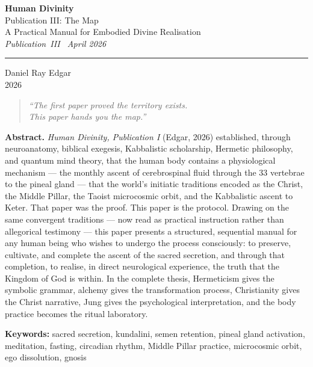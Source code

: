 \documentclass[12pt, a4paper]{article}
\begin{document}

\begin{titlepage}
  \centering
  \vspace*{2cm}

  {\LARGE\bfseries Human Divinity}\\[0.8em]
  {\large Publication III: The Map}\\[0.4em]
  {\large A Practical Manual for Embodied Divine Realisation}\\[0.4em]
  {\normalsize\itshape Publication~III \textbullet\ April 2026}

  \vspace{2cm}
  \rule{0.5\linewidth}{0.5pt}
  \vspace{2cm}

  {\large Daniel Ray Edgar}\\[0.4em]
  {\normalsize 2026}

  \vfill

  \begin{quote}
    \itshape\centering
    ``The first paper proved the territory exists.\\
    This paper hands you the map.''
  \end{quote}

  \vspace{1cm}
  \noindent\textbf{Abstract.}\quad
  \emph{Human Divinity, Publication I} (Edgar, 2026) established, through neuroanatomy,
  biblical exegesis, Kabbalistic scholarship, Hermetic philosophy, and quantum
  mind theory, that the human body contains a physiological mechanism — the
  monthly ascent of cerebrospinal fluid through the 33 vertebrae to the pineal
  gland — that the world's initiatic traditions encoded as the Christ, the
  Middle Pillar, the Taoist microcosmic orbit, and the Kabbalistic ascent to
  Keter. That paper was the proof. This paper is the protocol. Drawing on the
  same convergent traditions — now read as practical instruction rather than
  allegorical testimony — this paper presents a structured, sequential manual
  for any human being who wishes to undergo the process consciously: to
  preserve, cultivate, and complete the ascent of the sacred secretion, and
  through that completion, to realise, in direct neurological experience, the
  truth that the Kingdom of God is within. In the complete thesis,
  Hermeticism gives the symbolic grammar, alchemy gives the transformation
  process, Christianity gives the Christ narrative, Jung gives the
  psychological interpretation, and the body practice becomes the ritual
  laboratory.

  \vspace{0.5cm}
  \noindent\textbf{Keywords:} sacred secretion, kundalini, semen retention,
  pineal gland activation, meditation, fasting, circadian rhythm,
  Middle Pillar practice, microcosmic orbit, ego dissolution, gnosis

\end{titlepage}
\end{document}
